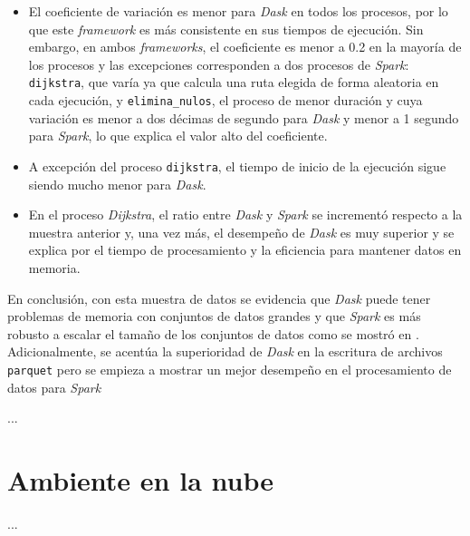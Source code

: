 \begin{itemize}
	\item El coeficiente de variación es menor para \textit{Dask} en todos los procesos, por lo que este \textit{framework} es más consistente en sus tiempos de ejecución. Sin embargo, en ambos \textit{frameworks}, el coeficiente es menor a 0.2 en la mayoría de los procesos y las excepciones corresponden a dos procesos de \textit{Spark}: \texttt{dijkstra}, que varía ya que calcula una ruta elegida de forma aleatoria en cada ejecución, y \texttt{elimina\_nulos}, el proceso de menor duración y cuya variación es menor a dos décimas de segundo para \textit{Dask} y menor a 1 segundo para \textit{Spark}, lo que explica el valor alto del coeficiente.
	
	\item A excepción del proceso \texttt{dijkstra}, el tiempo de inicio de la ejecución sigue siendo mucho menor para \textit{Dask}.
	
	\item En el proceso \textit{Dijkstra}, el ratio entre \textit{Dask} y \textit{Spark} se incrementó respecto a la muestra anterior y, una vez más, el desempeño de \textit{Dask} es muy superior y se explica por el tiempo de procesamiento y la eficiencia para mantener datos en memoria.

\end{itemize}

En conclusión, con esta muestra de datos se evidencia que \textit{Dask} puede tener problemas de memoria con conjuntos de datos grandes y que \textit{Spark} es más robusto a escalar el tamaño de los  conjuntos de datos como se mostró en \cite{comparative-evolution}. Adicionalmente, se acentúa la superioridad de \textit{Dask} en la escritura de archivos \texttt{parquet} pero se empieza a mostrar un mejor desempeño en el procesamiento de datos para \textit{Spark} 

\noindent ...

\section{Ambiente en la nube}

\noindent ...

